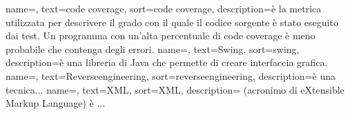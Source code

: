 {
name=,
text=code coverage,
sort=code coverage,
description={è la metrica utilizzata per descrivere il grado con il quale il codice sorgente è stato eseguito dai test.
Un programma con un'alta percentuale di code coverage è meno probabile che contenga degli errori.}
}
{
name=,
text=Swing,
sort=swing,
description={è una libreria di Java che permette di creare interfaccia grafica.}
}
{
name=,
text=Reverseengineering,
sort=reverseengineering,
description={è una tecnica...}
}
{
name=,
text=XML,
sort=XML,
description={ (acronimo di eXtensible Markup Language) è ... }
}

